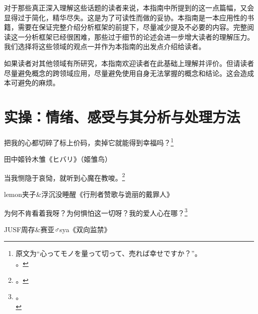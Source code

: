 \vspace{10pt}

对于那些真正深入理解这些话题的读者来说，本指南中所提到的这一点篇幅，又会显得过于简化，精华尽失。这是为了可读性而做的妥协。本指南是一本应用性的书籍，需要在保证完整介绍分析框架的前提下，尽量减少提及不必要的内容。完整阅读这一分析框架已经很困难，那些过于细节的论述会进一步增大读者的理解压力。我们选择将这些领域的观点一并作为本指南的出发点介绍给读者。

如果读者对其他领域有所研究，本指南欢迎读者在此基础上理解并评价。但请读者尽量避免概念的跨领域应用，尽量避免使用自身无法掌握的概念和结论。这会造成本可避免的麻烦。

\section{实操：情绪、感受与其分析与处理方法\label{sec:情绪、感受与其分析与处理方法}}
\hfill\begin{minipage}{0.7\textwidth}
\fontsize{8pt}{12pt}\selectfont\fontsize{8pt}{12pt}

\raggedright 把我的心都切碎了标上价码，卖掉它就能得到幸福吗？\footnote{原文为“心ってモノを量って切って、売れば幸せですか？”。\\\indent {}。}

\raggedleft 田中姬铃木雏《ヒバリ》（姬雏鸟）

\raggedright 当我恻隐于哀恸，就听到心魔在教唆。\footnote{。}

\raggedleft lemon夹子\&浮沉没睡醒《行刑者赞歌与诡丽的戴罪人》

\raggedright 为何不肯看着我呀？为何惧怕这一切呀？我的爱人心在哪？\footnote{。\\}

\raggedleft JUSF周存\&赛亚♂sya《双向监禁》
\end{minipage}

